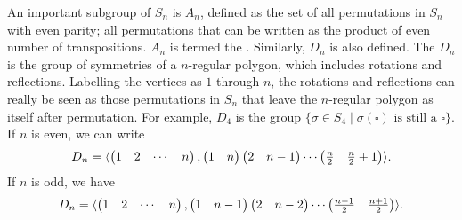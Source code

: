 An important subgroup of $S_{n}$ is $A_{n}$, defined as the set of all permutations in $S_{n}$ with even parity; all permutations that can be written as the product of even number of transpositions. $A_{n}$ is termed the . Similarly, $D_{n}$ is also defined. The  $D_{n}$ is the group of symmetries of a $n$-regular polygon, which includes rotations and reflections. Labelling the vertices as $1$ through $n$, the rotations and reflections can really be seen as those permutations in $S_{n}$ that leave the $n$-regular polygon as itself after permutation. For example, $D_{4}$ is the group $\{\sigma \in S_{4} \mid \sigma(\square) \text{ is still a } \square\}$. If $n$ is even, we can write
\begin{align}
    D_{n} = \langle\begin{pmatrix}
        1 & 2 & \cdots & n
    \end{pmatrix}, \begin{pmatrix}
        1 & n
    \end{pmatrix} \begin{pmatrix}
        2 & n-1
    \end{pmatrix} \cdots \begin{pmatrix}
        \frac{n}{2} & \frac{n}{2}+1
    \end{pmatrix}\rangle.
\end{align}
If $n$ is odd, we have
\begin{align}
    D_{n} = \langle\begin{pmatrix}
        1 & 2 & \cdots & n
    \end{pmatrix}, \begin{pmatrix}
        1 & n-1
    \end{pmatrix} \begin{pmatrix}
        2 & n-2
    \end{pmatrix} \cdots \begin{pmatrix}
        \frac{n-1}{2} & \frac{n+1}{2}
    \end{pmatrix}\rangle.
\end{align}